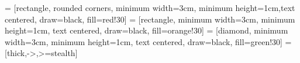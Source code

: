 \usepackage{tikz}
\usepackage{pgfplots}
\usepackage{pgf-pie}
\pgfplotsset{compat=1.18}
\usetikzlibrary{shapes.geometric, arrows}
 = [rectangle, rounded corners, minimum width=3cm, minimum height=1cm,text centered, draw=black, fill=red!30]
 = [rectangle, minimum width=3cm, minimum height=1cm, text centered, draw=black, fill=orange!30]
 = [diamond, minimum width=3cm, minimum height=1cm, text centered, draw=black, fill=green!30]
 = [thick,->,>=stealth]

\usepackage{ifthen}
